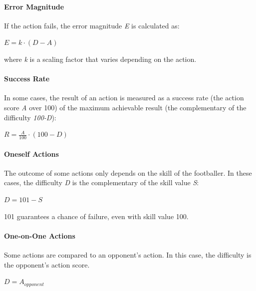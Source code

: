\documentclass[12pt]{article}
\begin{document}
\paragraph{Error Magnitude}

If the action fails, the error magnitude \emph{E} is calculated as:

\begin{formulabox}
$E = k \cdot (D - A)$
\end{formulabox}

where \emph{k} is a scaling factor that varies depending on the action.

\paragraph{Success Rate}

In some cases, the result of an action is measured as a success rate (the action score \emph{A} over 100) of the maximum achievable result (the complementary of the difficulty \emph{100-D}):

\begin{formulabox}
$R = \frac{A}{100} \cdot (100 - D)$
\end{formulabox}

\paragraph{Oneself Actions}

The outcome of some actions only depends on the skill of the footballer. In these cases, the difficulty \emph{D} is the complementary of the skill value \emph{S}:

\begin{formulabox}
$D = 101 - S$
\end{formulabox}

\begin{note}
101 guarantees a chance of failure, even with skill value 100.
\end{note}

\paragraph{One-on-One Actions}

Some actions are compared to an opponent's action. In this case, the difficulty is the opponent's action score.

\begin{formulabox}
$D = A_{opponent}$
\end{formulabox}
\end{document}
